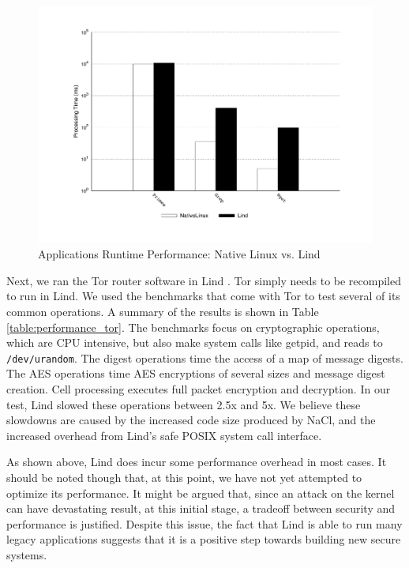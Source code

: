 \begin{figure}
\centering
\includegraphics[width=1.0\columnwidth]{diagram/lind_oakland16_performance.pdf}
\caption{Applications Runtime Performance: Native Linux vs. Lind}
\label{fig:performance_applications}
\end{figure}

Next, we ran the Tor router software in Lind . Tor simply
needs to be recompiled to run in Lind. 
We used the benchmarks that come with Tor to test several of its common
operations. 
A summary of the results is shown in Table \ref{table:performance_tor}. The
benchmarks focus on cryptographic operations, 
which are CPU intensive, but also make system calls like getpid, and reads to
\texttt{/dev/urandom}.
The digest operations time the access of a map of message digests. 
The AES operations time AES encryptions of several sizes and message 
digest creation. 
Cell processing executes full packet encryption and decryption. In our
test, 
Lind slowed these operations between 2.5x and 5x. We believe these
slowdowns 
are caused by the increased code size produced by NaCl, 
and the
increased overhead from Lind's safe POSIX system call interface. 

As shown above,  Lind does incur some performance overhead in most cases. 
It should be noted though that, at this point, we have not  yet attempted
to optimize its performance. 
It might be argued that, since an attack on the kernel can have devastating
result, at this initial stage, 
a tradeoff between security and performance is justified. Despite this
issue, 
the fact that Lind is able to run many  legacy applications 
suggests that it
is a positive step towards building new secure systems. 


